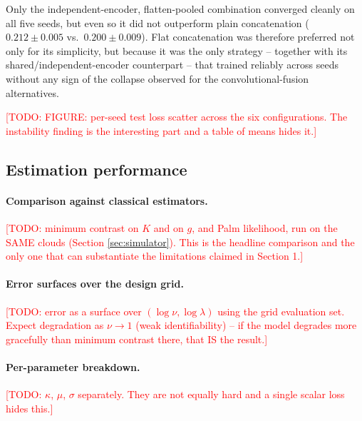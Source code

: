 \documentclass[11pt,letterpaper]{article}
\newcommand{\1}{\mathds{1}}
\newcommand{\todo}[1]{\textcolor{red}{[TODO: #1]}}
\newcommand{\todo}[1]{}
\theoremstyle{plain}
\theoremstyle{definitioncolon}
\begin{document}
Only the independent-encoder, flatten-pooled combination converged cleanly on all
five seeds, but even so it did not outperform plain concatenation
($0.212 \pm 0.005$ vs.\ $0.200 \pm 0.009$). Flat concatenation was therefore
preferred not only for its simplicity, but because it was the only strategy --
together with its shared/independent-encoder counterpart -- that trained reliably
across seeds without any sign of the collapse observed for the
convolutional-fusion alternatives.

\todo{FIGURE: per-seed test loss scatter across the six configurations. The
instability finding is the interesting part and a table of means hides it.}

\subsection{Estimation performance}
\label{ssec:exp-performance}

\paragraph{Comparison against classical estimators.}
\todo{minimum contrast on $K$ and on $g$, and Palm likelihood, run on the SAME
clouds (Section \ref{sec:simulator}). This is the headline comparison and the
only one that can substantiate the limitations claimed in Section 1.}

\paragraph{Error surfaces over the design grid.}
\todo{error as a surface over $(\log\nu, \log\lambda)$ using the grid evaluation
set. Expect degradation as $\nu \to 1$ (weak identifiability) -- if the model
degrades more gracefully than minimum contrast there, that IS the result.}

\paragraph{Per-parameter breakdown.}
\todo{$\kappa$, $\mu$, $\sigma$ separately. They are not equally hard and a
single scalar loss hides this.}
\end{document}
